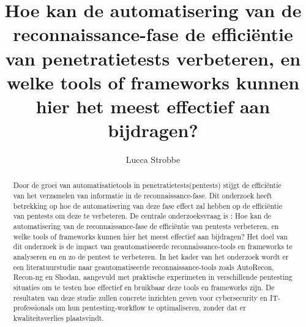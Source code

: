 \documentclass{hogent-article}
\title{Hoe kan de automatisering van de reconnaissance-fase de efficiëntie van penetratietests verbeteren, en welke tools of frameworks kunnen hier het meest \newline effectief aan bijdragen?}
\author{Lucca Strobbe}
\begin{document}
 

\begin{abstract}
  Door de groei van automatisatietools in penetratietests(pentests) stijgt de efficiëntie van het verzamelen van informatie in de reconnaissance-fase. 
  Dit onderzoek heeft betrekking op hoe de automatisering van deze fase effect zal hebben
  op de efficiëntie van pentests om deze te verbeteren. De centrale onderzoeksvraag is : Hoe kan de automatisering van de reconnaissance-fase de efficiëntie van pentests verbeteren, en welke tools of frameworks kunnen hier het meest effectief aan bijdragen?
  Het doel van dit onderzoek is de impact van geautomatiseerde reconnaissance-tools en frameworks te analyseren en en zo de pentest te verbeteren. 
  In het kader van het onderzoek wordt er een literatuurstudie naar geautomatiseerde reconnaissance-tools zoals AutoRecon, Recon-ng en Shodan, aangevuld met praktische 
  experimeten in verschillende pentesting situaties om te testen hoe effectief en bruikbaar deze tools en frameworks zijn. De resultaten van deze studie zullen concrete 
  inzichten geven voor cybersecurity en IT-professionals om hun pentesting-workflow te optimaliseren, zonder dat er kwaliteitsverlies plaatsvindt.

\end{abstract}

\tableofcontents



\printbibliography[heading=bibintoc]
\end{document}
